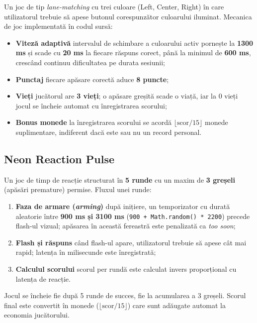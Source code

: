 \documentclass[12pt, a4paper, twoside]{report}
\numberwithin{equation}{section}
\begin{document}
Un joc de tip \textit{lane-matching} cu trei culoare (Left, Center, Right) în care
utilizatorul trebuie să apese butonul corespunzător culoarului iluminat. Mecanica
de joc implementată în codul sursă:
\begin{itemize}
  \item \textbf{Viteză adaptivă} \textemdash{} intervalul de schimbare a culoarului
    activ pornește la \textbf{1300 ms} și scade cu \textbf{20 ms} la fiecare
    răspuns corect, până la minimul de \textbf{600 ms}, crescând continuu
    dificultatea pe durata sesiunii;
  \item \textbf{Punctaj} \textemdash{} fiecare apăsare corectă aduce \textbf{8 puncte};
  \item \textbf{Vieți} \textemdash{} jucătorul are \textbf{3 vieți}; o apăsare
    greșită scade o viață, iar la 0 vieți jocul se încheie automat cu
    înregistrarea scorului;
  \item \textbf{Bonus monede} \textemdash{} la înregistrarea scorului se acordă
    $\lfloor \text{scor} / 15 \rfloor$ monede suplimentare, indiferent dacă este
    sau nu un record personal.
\end{itemize}

\subsection{Neon Reaction Pulse}

Un joc de timp de reacție structurat în \textbf{5 runde} cu un maxim de
\textbf{3 greșeli} (apăsări premature) permise. Fluxul unei runde:
\begin{enumerate}
  \item \textbf{Faza de armare (\textit{arming})} \textemdash{} după inițiere,
    un temporizator cu durată aleatorie între \textbf{900 ms și 3100 ms}
    (\texttt{900 + Math.random() * 2200}) precede flash-ul vizual; apăsarea în
    această fereastră este penalizată ca \textit{too soon};
  \item \textbf{Flash și răspuns} \textemdash{} când flash-ul apare, utilizatorul
    trebuie să apese cât mai rapid; latența în milisecunde este înregistrată;
  \item \textbf{Calculul scorului} \textemdash{} scorul per rundă este calculat
    invers proporțional cu latența de reacție.
\end{enumerate}
Jocul se încheie fie după 5 runde de succes, fie la acumularea a 3 greșeli.
Scorul final este convertit în monede ($\lfloor \text{scor} / 15 \rfloor$) care
sunt adăugate automat la economia jucătorului.
\end{document}
